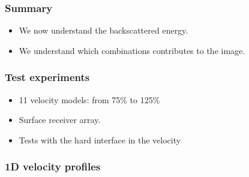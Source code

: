 \begin{frame} \frametitle{Summary}
\begin{itemize}
    \item We now understand the backscattered energy.
    \item We understand which combinations contributes to the image.
\end{itemize}
\end{frame}


\begin{frame} \frametitle{Test experiments}
\begin{itemize}
   \item 11 velocity models: from 75\% to 125\%
   \item Surface receiver array.
   \item Tests with the hard interface in the velocity
\end{itemize}
\end{frame}
\cwpnote{}

\begin{frame} \frametitle{1D velocity profiles}  \end{frame}





